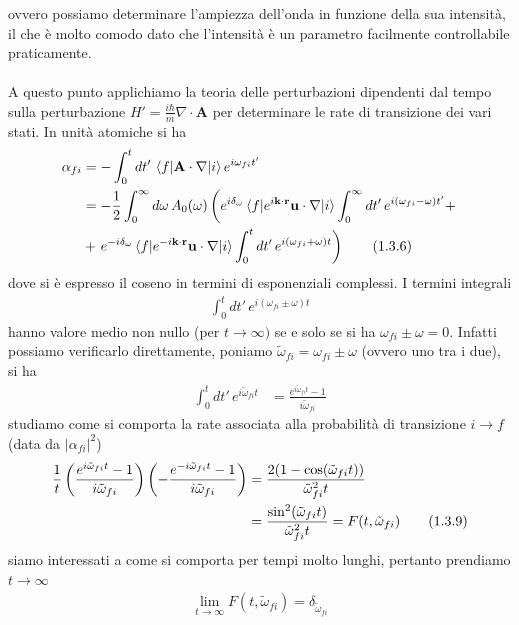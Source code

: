 \documentclass{article}
\begin{document}
ovvero possiamo determinare l'ampiezza dell'onda in funzione della sua intensità, il che è molto comodo dato che l'intensità è un parametro facilmente controllabile praticamente. \\ \\
A questo punto applichiamo la teoria delle perturbazioni dipendenti dal tempo sulla perturbazione $H' = \frac{i\hbar}{m}\nabla \cdot \mathbf{A}$ per determinare le rate di transizione dei vari stati. In unità atomiche si ha 
\begin{align}
    \alpha_{fi} &= -\int_0^t dt' \, \braket{f|\mathbf{A} \cdot \nabla|i}e^{i\omega_{fi}t'} \notag \\
    &= -\frac{1}{2}\int_0^\infty d\omega \, A_0(\omega)\left(e^{i\delta_\omega}\braket{f|e^{i\mathbf{k} \cdot \mathbf{r}}\mathbf{u} \cdot \nabla|i}\int_0^\infty dt' \, e^{i(\omega_{fi} - \omega)t'} +\right. \notag \\
    &+ \left.e^{-i\delta_\omega}\braket{f|e^{-i\mathbf{k} \cdot \mathbf{r}}\mathbf{u} \cdot \nabla|i}\int_0^t dt' \, e^{i(\omega_{fi} + \omega)t}\right) \tag{1.3.6}
\end{align}
dove si è espresso il coseno in termini di esponenziali complessi. I termini integrali 
\begin{align}
    \int_0^t dt' \, e^{i(\omega_{fi} \pm \omega)t} \tag{1.3.7}
\end{align}
hanno valore medio non nullo (per $t \rightarrow \infty)$ se e solo se si ha $\omega_{fi} \pm \omega = 0$. Infatti possiamo verificarlo direttamente, poniamo $\tilde{\omega}_{fi} = \omega_{fi} \pm \omega$ (ovvero uno tra i due), si ha
\begin{align}
    \int_0^t dt' \, e^{i\tilde{\omega}_{fi}t} &= \frac{e^{i\tilde{\omega}_{fi}t} - 1}{i\tilde{\omega}_{fi}} \tag{1.3.8}
\end{align}
studiamo come si comporta la rate associata alla probabilità di transizione $i \rightarrow f$ (data da $|\alpha_{fi}|^2$)
\begin{align}
    \frac{1}{t}\left(\frac{e^{i\tilde{\omega}_{fi}t} - 1}{i\tilde{\omega}_{fi}}\right)\left(-\frac{e^{-i\tilde{\omega}_{fi}t} - 1}{i\tilde{\omega}_{fi}}\right) &= \frac{2(1 - \cos(\tilde{\omega}_{fi}t))}{\tilde{\omega}^2_{fi}t} \notag \\
    &= \frac{\sin^2(\tilde{\omega}_{fi}t)}{\tilde{\omega}^2_{fi}t} = F(t, \tilde{\omega}_{fi}) \tag{1.3.9}
\end{align}
siamo interessati a come si comporta per tempi molto lunghi, pertanto prendiamo $t \rightarrow \infty$
\begin{align}
    \lim_{t \rightarrow \infty}F(t, \tilde{\omega}_{fi}) = \delta_{\tilde{\omega}_{fi}} \tag{1.3.10}
\end{align}
\end{document}
